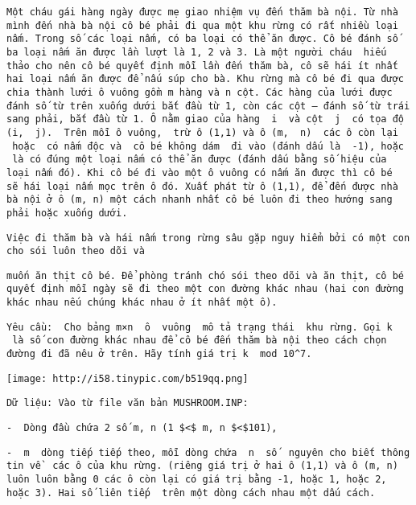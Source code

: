 \begin{verbatim}
Một cháu gái hàng ngày được mẹ giao nhiệm vụ đến thăm bà nội. Từ nhà mình đến nhà bà nội cô bé phải đi qua một khu rừng có rất nhiều loại nấm. Trong số các loại nấm, có ba loại có thể ăn được. Cô bé đánh số ba loại nấm ăn được lần lượt là 1, 2 và 3. Là một người cháu  hiếu thảo cho nên cô bé quyết định mỗi lần đến thăm bà, cô sẽ hái ít nhất hai loại nấm ăn được để nấu súp cho bà. Khu rừng mà cô bé đi qua được chia thành lưới ô vuông gồm m hàng và n cột. Các hàng của lưới được đánh số từ trên xuống dưới bắt đầu từ 1, còn các cột – đánh số từ trái sang phải, bắt đầu từ 1. Ô nằm giao của hàng  i  và cột  j  có tọa độ (i,  j).  Trên mỗi ô vuông,  trừ ô (1,1) và ô (m,  n)  các ô còn lại  hoặc  có nấm độc và  cô bé không dám  đi vào (đánh dấu là  -1), hoặc  là có đúng một loại nấm có thể ăn được (đánh dấu bằng số hiệu của loại nấm đó). Khi cô bé đi vào một ô vuông có nấm ăn được thì cô bé sẽ hái loại nấm mọc trên ô đó. Xuất phát từ ô (1,1), để đến được nhà bà nội ở ô (m, n) một cách nhanh nhất cô bé luôn đi theo hướng sang phải hoặc xuống dưới.\end{verbatim}
\begin{verbatim}
Việc đi thăm bà và hái nấm trong rừng sâu gặp nguy hiểm bởi có một con cho sói luôn theo dõi và \end{verbatim}
\begin{verbatim}
muốn ăn thịt cô bé. Để phòng tránh chó sói theo dõi và ăn thịt, cô bé quyết định mỗi ngày sẽ đi theo một con đường khác nhau (hai con đường khác nhau nếu chúng khác nhau ở ít nhất một ô). \end{verbatim}
\begin{verbatim}
Yêu cầu:  Cho bảng m×n  ô  vuông  mô tả trạng thái  khu rừng. Gọi k  là số con đường khác nhau để cô bé đến thăm bà nội theo cách chọn đường đi đã nêu ở trên. Hãy tính giá trị k  mod 10^7.\end{verbatim}
\texttt{[image: http://i58.tinypic.com/b519qq.png]}
\begin{verbatim}
Dữ liệu: Vào từ file văn bản MUSHROOM.INP:\end{verbatim}
\begin{verbatim}
-  Dòng đầu chứa 2 số m, n (1 $<$ m, n $<$101),\end{verbatim}
\begin{verbatim}
-  m  dòng tiếp tiếp theo, mỗi dòng chứa  n  số  nguyên cho biết thông tin về  các ô của khu rừng. (riêng giá trị ở hai ô (1,1) và ô (m, n) luôn luôn bằng 0 các ô còn lại có giá trị bằng -1, hoặc 1, hoặc 2, hoặc 3). Hai số liên tiếp  trên một dòng cách nhau một dấu cách.\end{verbatim}
